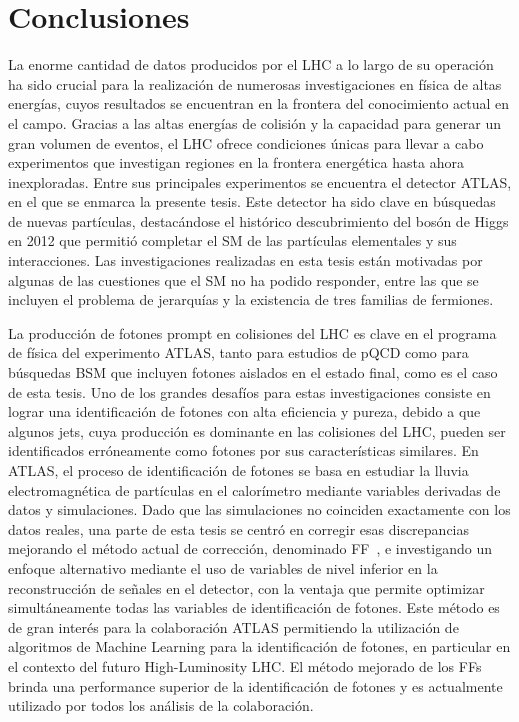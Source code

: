 \chapter*{Conclusiones}




La enorme cantidad de datos producidos por el \ac{LHC} a lo largo de su operación ha sido crucial para la realización de numerosas investigaciones en física de altas energías, cuyos resultados se encuentran en la frontera del conocimiento actual en el campo. Gracias a las altas energías de colisión y la capacidad para generar un gran volumen de eventos, el \ac{LHC} ofrece condiciones únicas para llevar a cabo experimentos que investigan regiones en la frontera energética hasta ahora inexploradas. Entre sus principales experimentos se encuentra el detector \ac{ATLAS}, en el que se enmarca la presente tesis. Este detector ha sido clave en búsquedas de nuevas partículas, destacándose el histórico descubrimiento del bosón de Higgs en 2012 que permitió completar el \ac{SM} de las partículas elementales y sus interacciones. Las investigaciones realizadas en esta tesis están motivadas por algunas de las cuestiones que el \ac{SM} no ha podido responder, entre las que se incluyen el problema de jerarquías y la existencia de tres familias de fermiones.

La producción de fotones prompt en colisiones \pp del \ac{LHC} es clave en el programa de física del experimento \ac{ATLAS}, tanto para estudios de \ac{pQCD} como para búsquedas \ac{BSM} que incluyen fotones aislados en el estado final, como es el caso de esta tesis. Uno de los grandes desafíos para estas investigaciones consiste en lograr una identificación de fotones con alta eficiencia y pureza, debido a que algunos jets, cuya producción es dominante en las colisiones del \ac{LHC}, pueden ser identificados erróneamente como fotones por sus características similares. En \ac{ATLAS}, el proceso de identificación de fotones se basa en estudiar la lluvia electromagnética de partículas en el calorímetro mediante variables derivadas de datos y simulaciones. Dado que las simulaciones no coinciden exactamente con los datos reales, una parte de esta tesis se centró en corregir esas discrepancias mejorando el método actual de corrección, denominado \acf{FF}~\cite{ATLAS-QT-Sili}, e investigando un enfoque alternativo mediante el uso de variables de nivel inferior en la reconstrucción de señales en el detector, con la ventaja que permite optimizar simultáneamente todas las variables de identificación de fotones. Este método es de gran interés para la colaboración \ac{ATLAS} permitiendo la utilización de algoritmos de Machine Learning para la identificación de fotones, en particular en el contexto del futuro High-Luminosity \ac{LHC}. El método mejorado de los \acp{FF} brinda una performance superior de la identificación de fotones y es actualmente utilizado por todos los análisis de la colaboración.

